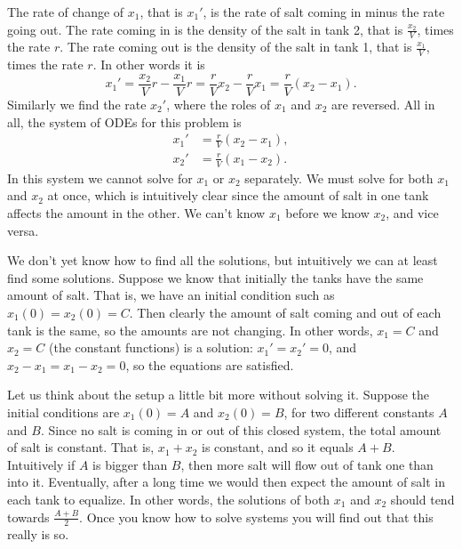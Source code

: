 \begin{exampleSol}
The rate of change of $x_1$,
that is $x_1'$, is the
rate of salt coming in minus the rate going out.
The rate coming in is the
density of the salt in tank 2, that is $\frac{x_2}{V}$, times the rate $r$.
The rate coming out is the
density of the salt in tank 1, that is $\frac{x_1}{V}$, times the rate $r$.
In other words it is
\begin{equation*}
x_1' = \frac{x_2}{V} r - \frac{x_1}{V} r =
\frac{r}{V} x_2 - \frac{r}{V} x_1  = \frac{r}{V} (x_2-x_1).
\end{equation*}
Similarly we find the rate $x_2'$, where the roles of $x_1$ and $x_2$
are reversed.  All in all, the system of ODEs for this problem is
\begin{align*}
x_1' & = \frac{r}{V} (x_2-x_1), \\
x_2' & = \frac{r}{V} (x_1-x_2).
\end{align*}
In this system we cannot solve for $x_1$ or $x_2$ separately.  We must
solve for both $x_1$ and $x_2$ at once, which is intuitively clear since
the amount of salt in one tank affects the amount in the other.
We can't know $x_1$ before we know $x_2$, and vice versa.

We don't yet know how to find all the solutions, but
intuitively we can at least find some solutions.  Suppose we
know that initially the tanks have the same amount of salt.  That is,
we have an initial condition such as $x_1(0)=x_2(0) = C$.  Then clearly the
amount of salt coming and out of each tank is the same, so the amounts are
not changing.  In other words, $x_1 = C$ and $x_2 = C$ (the constant
functions) is a solution:  $x_1' = x_2' = 0$, and
$x_2-x_1 = x_1-x_2 = 0$, so the equations are satisfied.

Let us think about the setup a little bit more without solving it.  Suppose the
initial conditions are $x_1(0) = A$ and $x_2(0) = B$, for two different
constants $A$ and $B$.  Since no salt is coming in or out of this closed system,
the total amount of salt is constant.  That is, $x_1+x_2$ is constant,
and so it equals $A+B$.
Intuitively if $A$ is bigger than $B$, then more salt will flow out of tank
one than into it.  Eventually, after a long time we would then expect
the amount of salt in each tank to equalize. In other words,
the solutions of both $x_1$ and $x_2$ should
tend towards $\frac{A+B}{2}$.  Once you know how to solve systems
you will find out that this really is so.
\end{exampleSol}

